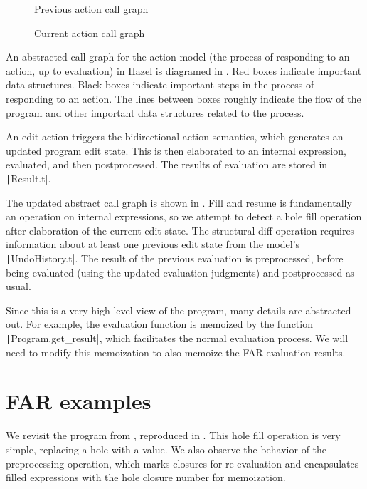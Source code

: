 \begin{figure}
  \centering
  
  \caption{Previous action call graph}
  \label{fig:prev-evaluation-call-graph}
\end{figure}

\begin{figure}
  \centering
  
  \caption{Current action call graph}
  \label{fig:current-evaluation-call-graph}
\end{figure}

An abstracted call graph for the action model (the process of responding to an action, up to evaluation) in Hazel is diagramed in . Red boxes indicate important data structures. Black boxes indicate important steps in the process of responding to an action. The lines between boxes roughly indicate the flow of the program and other important data structures related to the process.

An edit action triggers the bidirectional action semantics, which generates an updated program edit state. This is then elaborated to an internal expression, evaluated, and then postprocessed. The results of evaluation are stored in \texttt|Result.t|.

The updated abstract call graph is shown in . Fill and resume is fundamentally an operation on internal expressions, so we attempt to detect a hole fill operation after elaboration of the current edit state. The structural diff operation requires information about at least one previous edit state from the model's \texttt|UndoHistory.t|. The result of the previous evaluation is preprocessed, before being evaluated (using the updated evaluation judgments) and postprocessed as usual.

Since this is a very high-level view of the program, many details are abstracted out. For example, the evaluation function is memoized by the function \texttt|Program.get_result|, which facilitates the normal evaluation process. We will need to modify this memoization to also memoize the FAR evaluation results.

\section{FAR examples}
\label{sec:far-examples}

We revisit the program from , reproduced in . This hole fill operation is very simple, replacing a hole with a value. We also observe the behavior of the preprocessing operation, which marks closures for re-evaluation and encapsulates filled expressions with the hole closure number for memoization.

